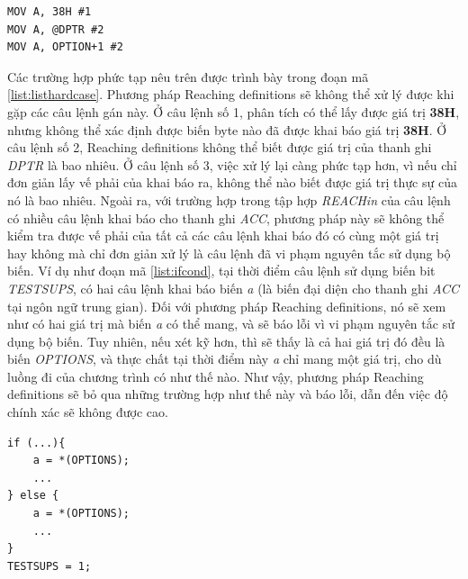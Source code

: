 \begin{lstlisting}[caption={Một số câu lệnh gán mà phương pháp Suy luận kiểu sử dụng Reaching definitions không xử lý được},label={list:listhardcase}]
MOV A, 38H #1
MOV A, @DPTR #2
MOV A, OPTION+1 #2
\end{lstlisting}
Các trường hợp phức tạp nêu trên được trình bày trong đoạn mã \ref{list:listhardcase}. 
Phương pháp Reaching definitions sẽ không thể xử lý được khi gặp các câu lệnh gán này. Ở câu lệnh số 1, phân tích có thể lấy được giá trị \textbf{38H}, nhưng không thể xác định được biến byte nào đã được khai báo giá trị \textbf{38H}. Ở câu lệnh số 2, Reaching definitions không thể biết được giá trị của thanh ghi \textit{DPTR} là bao nhiêu. Ở câu lệnh số 3, việc xử lý lại càng phức tạp hơn, vì nếu chỉ đơn giản lấy vế phải của khai báo ra, không thể nào biết được giá trị thực sự của nó là bao nhiêu.
Ngoài ra, với trường hợp trong tập hợp \textit{REACHin} của câu lệnh có nhiều câu lệnh khai báo cho thanh ghi \textit{ACC}, phương pháp này sẽ không thể kiểm tra được vế phải của tất cả các câu lệnh khai báo đó có cùng một giá trị hay không mà chỉ đơn giản xử lý là câu lệnh đã vi phạm nguyên tắc sử dụng bộ biến. Ví dụ như đoạn mã \ref{list:ifcond}, tại thời điểm câu lệnh sử dụng biến bit \textit{TESTSUPS}, có hai câu lệnh khai báo biến \textit{a} (là biến đại diện cho thanh ghi \textit{ACC} tại ngôn ngữ trung gian). Đối với phương pháp Reaching definitions, nó sẽ xem như có hai giá trị mà biến \textit{a} có thể mang, và sẽ báo lỗi vì vi phạm nguyên tắc sử dụng bộ biến. Tuy nhiên, nếu xét kỹ hơn, thì sẽ thấy là cả hai giá trị đó đều là biến \textit{OPTIONS}, và thực chất tại thời điểm này \textit{a} chỉ mang một giá trị, cho dù luồng đi của chương trình có như thế nào. Như vậy, phương pháp Reaching definitions sẽ bỏ qua những trường hợp như thế này và báo lỗi, dẫn đến việc độ chính xác sẽ không được cao.
\begin{lstlisting}[caption={Đoạn mã có nhiều câu lệnh khai báo cho ACC đến được một điểm của chương trình nhưng tất cả đều cùng giá trị},label={list:ifcond}]
if (...){
	a = *(OPTIONS);
	...
} else {
	a = *(OPTIONS);
	...
}
TESTSUPS = 1;
\end{lstlisting}

